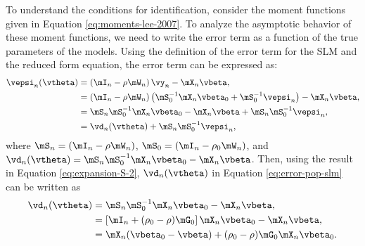 \documentclass[english,12pt]{book}\usepackage[]{graphicx}\usepackage[]{xcolor}
\begin{document}
To understand the conditions for identification, consider the moment functions given in Equation \eqref{eq:moments-lee-2007}. To analyze the asymptotic behavior of these moment functions, we need to write the error term as a function of the true parameters of the models. Using the definition of the error term for the SLM and the reduced form equation, the error term can be expressed as:
\begin{equation}\label{eq:error-pop-slm}
  \begin{aligned}
    \vepsi_n(\vtheta) & = \left(\mI_n - \rho \mW_n\right)\vy_n - \mX_n\vbeta, \\
                      & = \left(\mI_n - \rho \mW_n\right)\left(\mS_0^{-1}\mX_n\vbeta_0 + \mS_0^{-1}\vepsi_n\right) - \mX_n\vbeta, \\
                      & = \mS_n\mS_0^{-1}\mX_n\vbeta_0 - \mX_n\vbeta + \mS_n\mS_0^{-1}\vepsi_n, \\
                      & = \vd_n(\vtheta) + \mS_n\mS_0^{-1}\vepsi_n,
  \end{aligned}
\end{equation}
%
where $\mS_n = \left(\mI_n - \rho \mW_n\right)$, $\mS_0 = \left(\mI_n - \rho_0 \mW_n\right)$, and $\vd_n(\vtheta) = \mS_n\mS_0^{-1}\mX_n\vbeta_0 - \mX_n\vbeta$. Then, using the result in Equation \eqref{eq:expansion-S-2}, $\vd_n(\vtheta)$ in Equation \eqref{eq:error-pop-slm} can be written as
\begin{equation*}
\begin{aligned}
\vd_n(\vtheta) & = \mS_n\mS_0^{-1}\mX_n\vbeta_0 - \mX_n\vbeta,  \\
               & = \left[\mI_n + (\rho_0 - \rho)\mG_0\right]\mX_n\vbeta_0 - \mX_n\vbeta, \\
               & = \mX_n(\vbeta_0 - \vbeta) + (\rho_0 - \rho)\mG_0\mX_n\vbeta_0.
\end{aligned}
\end{equation*}
\end{document}
